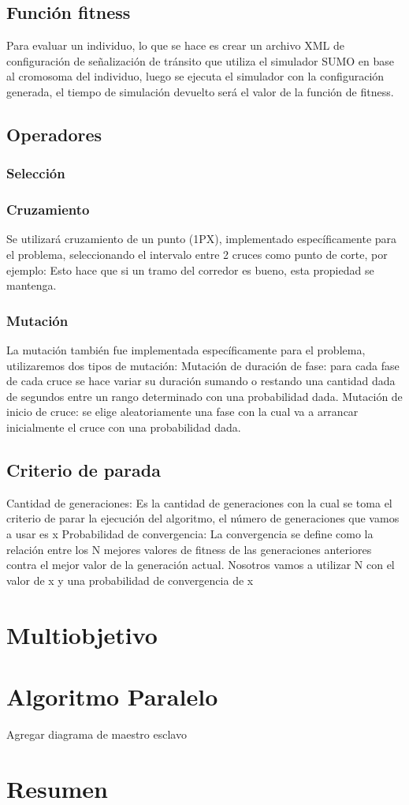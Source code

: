 \subsection{Función fitness}
Para evaluar un individuo, lo que se hace es crear un archivo
XML  de configuración de señalización de tránsito que utiliza
el  simulador  SUMO  en  base  al  cromosoma  del  individuo,
luego se ejecuta el simulador con la configuración generada, el
tiempo de simulación devuelto será el valor de la función de
fitness.

\subsection{Operadores}
\subsubsection{Selección}
\subsubsection{Cruzamiento}
Se  utilizará  cruzamiento  de  un  punto  (1PX),  implementado
específicamente  para  el  problema,  seleccionando  el  intervalo
entre 2 cruces como punto de corte, por ejemplo:
Esto  hace  que  si  un  tramo  del  corredor  es  bueno,  esta
propiedad se mantenga.

\subsubsection{Mutación}
La  mutación también fue  implementada  específicamente para
el problema, utilizaremos dos tipos de mutación:
Mutación de duración de fase: para cada fase de cada cruce se
hace variar su duración sumando o restando una cantidad dada
de segundos entre un rango determinado con una probabilidad
dada.
Mutación de inicio de cruce: se elige aleatoriamente una fase
con  la  cual  va  a  arrancar  inicialmente  el  cruce  con  una
probabilidad dada.

\subsection{Criterio de parada}
 Cantidad  de  generaciones:  Es  la  cantidad  de
 generaciones  con  la  cual  se  toma  el  criterio  de  parar  la
 ejecución del algoritmo, el número de generaciones que vamos
 a usar es x
 Probabilidad  de  convergencia:  La  convergencia  se
 define como la relación entre los N mejores valores de fitness
 de  las  generaciones  anteriores  contra  el  mejor  valor  de  la
 generación actual. Nosotros vamos a utilizar N con el valor de
 x y una probabilidad de convergencia de x




\section{Multiobjetivo}

\section{Algoritmo Paralelo}
Agregar diagrama de maestro esclavo



\section{Resumen}